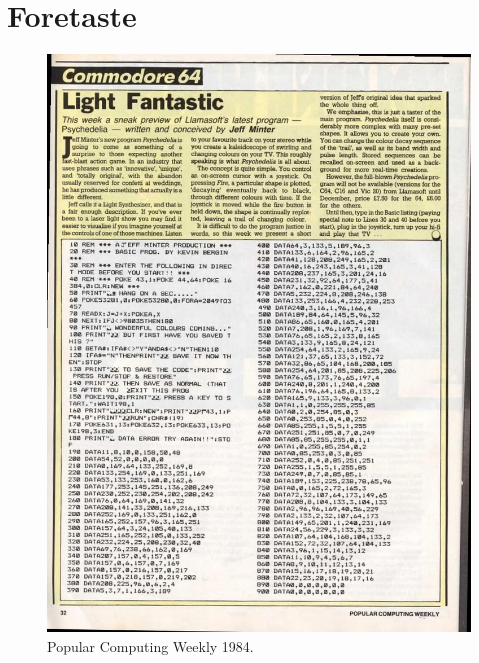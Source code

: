 \chapter{Foretaste} 
\lstset{style=6502Style}


\clearpage
\begin{figure}[H]
    \centering
    \begin{adjustbox}{width=12cm,center}
      \includegraphics[width=12cm]{src/listing/PopularComputing_Weekly_Issue_1984-12-13_0031.jpg}%
    \end{adjustbox}
\caption{Popular Computing Weekly 1984.}
\end{figure}

